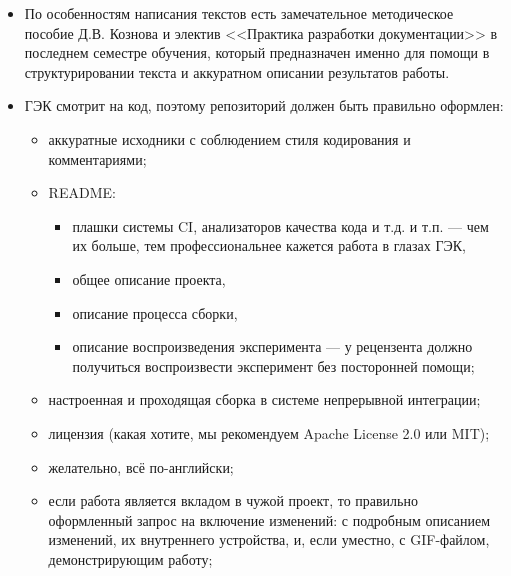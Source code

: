 \documentclass{article}
\begin{document}
\begin{itemize}
    \item По особенностям написания текстов есть замечательное методическое пособие Д.В. Кознова и электив <<Практика разработки документации>> в последнем семестре обучения, который предназначен именно для помощи в структурировании текста и аккуратном описании результатов работы.
    \item ГЭК смотрит на код, поэтому репозиторий должен быть правильно оформлен:
    \begin{itemize}
        \item аккуратные исходники с соблюдением стиля кодирования и комментариями;
        \item README:
        \begin{itemize}
            \item плашки системы CI, анализаторов качества кода и т.д. и т.п. --- чем их больше, тем профессиональнее кажется работа в глазах ГЭК,
            \item общее описание проекта,
            \item описание процесса сборки,
            \item описание воспроизведения эксперимента --- у рецензента должно получиться воспроизвести эксперимент без посторонней помощи;
        \end{itemize}
        \item настроенная и проходящая сборка в системе непрерывной интеграции;
        \item лицензия (какая хотите, мы рекомендуем Apache License 2.0 или MIT);
        \item желательно, всё по-английски;
        \item если работа является вкладом в чужой проект, то правильно оформленный запрос на включение изменений: с подробным описанием изменений, их внутреннего устройства, и, если уместно, с GIF-файлом, демонстрирующим работу;
    \end{itemize}
\end{itemize}
\end{document}
